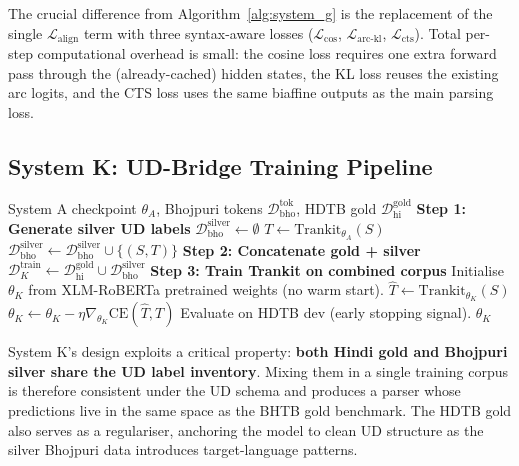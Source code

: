 \documentclass[12pt,a4paper,oneside]{report}
\newcommand{\xlmr}{XLM-RoBERTa}
\begin{document}
The crucial difference from Algorithm~\ref{alg:system_g} is the replacement of
the single $\mathcal{L}_{\text{align}}$ term with three syntax-aware losses
($\mathcal{L}_{\text{cos}}$, $\mathcal{L}_{\text{arc-kl}}$,
$\mathcal{L}_{\text{cts}}$). Total per-step computational overhead is small:
the cosine loss requires one extra forward pass through the (already-cached)
hidden states, the KL loss reuses the existing arc logits, and the CTS loss
uses the same biaffine outputs as the main parsing loss.

\subsection{System K: UD-Bridge Training Pipeline}

\begin{algorithm}[ht]
\caption{System K (UD-Bridge) end-to-end pipeline.}
\label{alg:system_k}
\begin{algorithmic}[1]
\Require System A checkpoint $\theta_A$, Bhojpuri tokens
         $\mathcal{D}^{\text{tok}}_{\text{bho}}$, HDTB gold
         $\mathcal{D}^{\text{gold}}_{\text{hi}}$
\Statex \textbf{Step 1: Generate silver UD labels}
\State $\mathcal{D}^{\text{silver}}_{\text{bho}} \gets \emptyset$
    \State $T \gets \text{Trankit}_{\theta_A}(S)$
        \State $\mathcal{D}^{\text{silver}}_{\text{bho}} \gets \mathcal{D}^{\text{silver}}_{\text{bho}} \cup \{(S, T)\}$
    \EndIf
\EndFor
\Statex \textbf{Step 2: Concatenate gold + silver}
\State $\mathcal{D}^{\text{train}}_K \gets \mathcal{D}^{\text{gold}}_{\text{hi}} \cup \mathcal{D}^{\text{silver}}_{\text{bho}}$
\Statex \textbf{Step 3: Train Trankit on combined corpus}
\State Initialise $\theta_K$ from \xlmr{} pretrained weights (no warm start).
        \State $\hat{T} \gets \text{Trankit}_{\theta_K}(S)$
        \State $\theta_K \gets \theta_K - \eta \nabla_{\theta_K} \text{CE}(\hat{T}, T)$
    \EndFor
    \State Evaluate on HDTB dev (early stopping signal).
\EndFor
\State \Return $\theta_K$
\end{algorithmic}
\end{algorithm}

System K's design exploits a critical property: \textbf{both Hindi gold and
Bhojpuri silver share the UD label inventory}. Mixing them in a single
training corpus is therefore consistent under the UD schema and produces a
parser whose predictions live in the same space as the BHTB gold benchmark.
The HDTB gold also serves as a regulariser, anchoring the model to clean UD
structure as the silver Bhojpuri data introduces target-language patterns.
\end{document}
